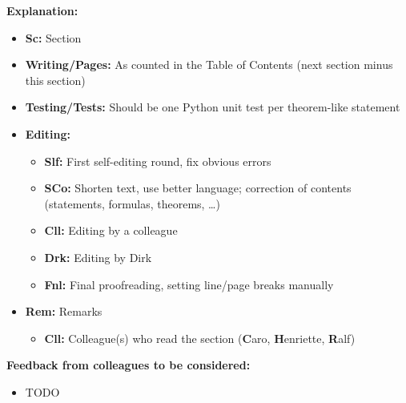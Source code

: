 \clearpage

\noindent
\textbf{Explanation:}

\begin{itemize}
  \item
  \textbf{Sc:}
  Section
  
  \item
  \textbf{Writing/Pages:}
  As counted in the Table of Contents
  (next section minus this section)
  
  \item
  \textbf{Testing/Tests:}
  Should be one Python unit test per theorem-like statement
  
  \item
  \textbf{Editing:}
  \begin{itemize}
    \item
    \textbf{Slf:}
    First self-editing round, fix obvious errors
    
    \item
    \textbf{SCo:}
    Shorten text, use better language;
    correction of contents (statements, formulas, theorems, \dots)
    
    \item
    \textbf{Cll:}
    Editing by a colleague
    
    \item
    \textbf{Drk:}
    Editing by Dirk
    
    \item
    \textbf{Fnl:}
    Final proofreading, setting line/page breaks manually
  \end{itemize}
  
  \item
  \textbf{Rem:}
  Remarks
  \begin{itemize}
    \item
    \textbf{Cll:}
    Colleague(s) who read the section
    (\textbf{C}aro,
    \textbf{H}enriette,
    \textbf{R}alf)
  \end{itemize}
\end{itemize}

\noindent
\textbf{Feedback from colleagues to be considered:}

\begin{itemize}
  \item
  TODO
\end{itemize}

\cleardoublepage
